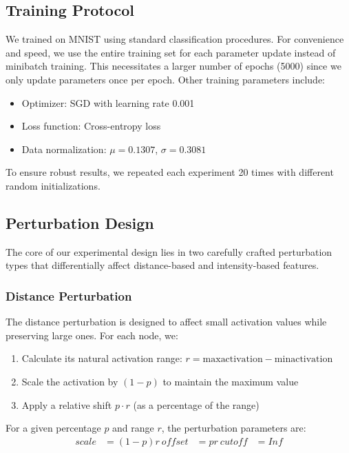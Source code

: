 \subsection{Training Protocol}
We trained on MNIST using standard classification procedures. For convenience and speed, we use the entire training set for each parameter update instead of minibatch training. This necessitates a larger number of epochs (5000) since we only update parameters once per epoch. Other training parameters include:
\begin{itemize}
    \item Optimizer: SGD with learning rate 0.001
    \item Loss function: Cross-entropy loss
    \item Data normalization: $\mu = 0.1307$, $\sigma = 0.3081$
\end{itemize}

To ensure robust results, we repeated each experiment 20 times with different random initializations.

\subsection{Perturbation Design}
The core of our experimental design lies in two carefully crafted perturbation types that differentially affect distance-based and intensity-based features.

\subsubsection{Distance Perturbation}
The distance perturbation is designed to affect small activation values while preserving large ones. For each node, we:
\begin{enumerate}
    \item Calculate its natural activation range: $r = \text{max}{\text{activation}} - \text{min}{\text{activation}}$
    \item Scale the activation by $(1-p)$ to maintain the maximum value
    \item Apply a relative shift $p \cdot r$ (as a percentage of the range)
\end{enumerate}

For a given percentage $p$ and range $r$, the perturbation parameters are:
\begin{align}
    scale &= (1-p) r \
    offset &= p r \
    cutoff &= Inf
\end{align}

